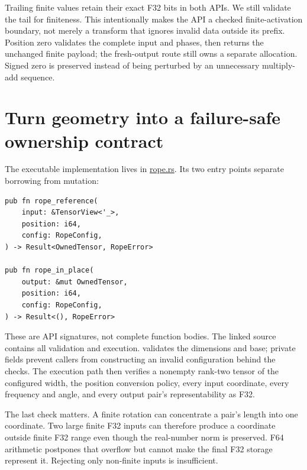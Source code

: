 Trailing finite values retain their exact F32 bits in both APIs. We
still validate the tail for finiteness. This intentionally makes the API
a checked finite-activation boundary, not merely a transform that
ignores invalid data outside its prefix. Position zero validates the
complete input and phases, then returns the unchanged finite payload;
the fresh-output route still owns a separate allocation. Signed zero is
preserved instead of being perturbed by an unnecessary multiply-add
sequence.

\section{Turn geometry into a failure-safe ownership
contract}\label{turn-geometry-into-a-failure-safe-ownership-contract}


The executable implementation lives in
\href{https://github.com/hermonai/inside-the-llm-engine/blob/astra-visual-rewrite/code/mini-engine/crates/engine0/src/rope.rs}{rope.rs}.
Its two entry points separate borrowing from mutation:

\begin{verbatim}
pub fn rope_reference(
    input: &TensorView<'_>,
    position: i64,
    config: RopeConfig,
) -> Result<OwnedTensor, RopeError>

pub fn rope_in_place(
    output: &mut OwnedTensor,
    position: i64,
    config: RopeConfig,
) -> Result<(), RopeError>
\end{verbatim}

These are API signatures, not complete function bodies. The linked
source contains all validation and execution.
\texttt{} validates the dimensions and
base; private fields prevent callers from constructing an invalid
configuration behind the checks. The execution path then verifies a
nonempty rank-two tensor of the configured width, the position
conversion policy, every input coordinate, every frequency and angle,
and every output pair's representability as F32.

The last check matters. A finite rotation can concentrate a pair's
length into one coordinate. Two large finite F32 inputs can therefore
produce a coordinate outside finite F32 range even though the
real-number norm is preserved. F64 arithmetic postpones that overflow
but cannot make the final F32 storage represent it. Rejecting only
non-finite inputs is insufficient.

